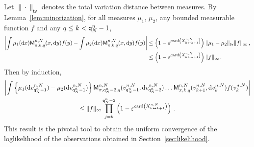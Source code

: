 Let $\|\cdot\|_{\mathsf{tv}}$ denotes the total variation distance between measures. By Lemma~\ref{lem:minorization}, for all measures $\mu_1$, $\mu_2$, any bounded measurable function $f$ and any $q\le k < {\mathsf{q}}^{n}_{N}-1$,
\begin{align*}
\left|\int \mu_1 (\mathrm{d} x)\mathsf{M}^{n,N}_{\pi,k,q}(x,\mathrm{d} y)f(y) - \int \mu_2 (\mathrm{d} x)\mathsf{M}^{n,N}_{\pi,k,q}(x,\mathrm{d} y)f(y) \right|&\le \left(1-\varepsilon^{\mathrm{card}\left(X^{n,N}_{k\leftrightarrow k+1}\right)}\right)\|\mu_1-\mu_2\|_{\mathsf{tv}}\|f\|_{\infty}\,,\\
&\le \left(1-\varepsilon^{\mathrm{card}\left(X^{n,N}_{k\leftrightarrow k+1}\right)}\right)\|f\|_{\infty}\,.
\end{align*}
Then by induction,
\begin{multline}
\label{eq:exp:forgetting}
\left|\int \left\{\mu_1(\mathrm{d} v^{n,N}_{{\mathsf{q}}^{n}_{N}-1})-\mu_2(\mathrm{d} v^{n,N}_{{\mathsf{q}}^{n}_{N}-1})\right\} \mathsf{M}^{n,N}_{\pi,{\mathsf{q}}^{n}_{N}-2,q}(v_{{\mathsf{q}}^{n}_{N}-1}^{n,N},\mathrm{d} v_{{\mathsf{q}}^{n}_{N}-2}^{n,N})\ldots\mathsf{M}^{n,N}_{\pi,k,q}(v_{k+1}^{n,N},\mathrm{d} v_k^{n,N})f(v_k^{n,N})\right|\\
\le \|f\|_{\infty}\prod_{j=k}^{{\mathsf{q}}^{n}_{N}-2}\left(1-\varepsilon^{\mathrm{card}\left(X^{n,N}_{k\leftrightarrow k+1}\right)}\right)\,.
\end{multline}
This result is the pivotal tool to obtain the uniform convergence of the loglikelihood of the observations obtained in Section~\ref{sec:likelihood}.
%

